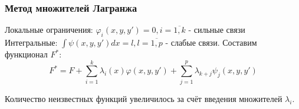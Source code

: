 \documentclass[a4paper, 14pt]{extarticle}
\numberwithin{equation}{section}
\begin{document}
    \subsubsection{Метод множителей Лагранжа}
    Локальные ограничения: $\varphi_i(x,y,y')=0, i=\overline{1,k} $ - сильные связи\\
    Интегральные: $\int \psi (x,y,y')dx =l, l=\overline{1,p}$ - слабые связи.
    Составим функционал $F^*$:
    \[ F^* = F + \sum^k_{i=1} \lambda_i(x)\varphi(x, y, y') + \sum^p_{j=1} \lambda_{k+j} \psi_j (x, y, y') \]
    
    Количество неизвестных функций увеличилось за счёт введения множителей $\lambda_i$. 

	
	
	
	
\end{document}
